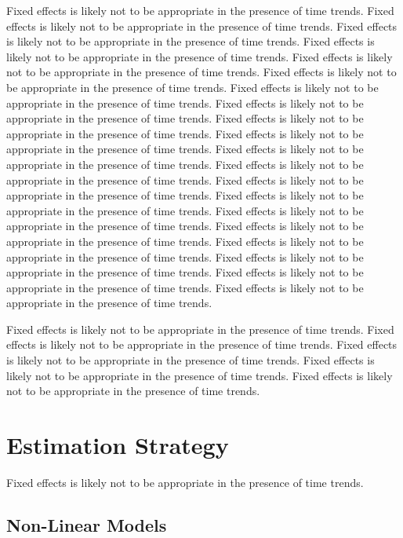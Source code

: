 \documentclass[11pt]{article}
\begin{document}
Fixed effects is likely not to be appropriate in the presence of time trends. 
Fixed effects is likely not to be appropriate in the presence of time trends. 
Fixed effects is likely not to be appropriate in the presence of time trends. 
Fixed effects is likely not to be appropriate in the presence of time trends. 
Fixed effects is likely not to be appropriate in the presence of time trends. 
Fixed effects is likely not to be appropriate in the presence of time trends. 
Fixed effects is likely not to be appropriate in the presence of time trends. 
Fixed effects is likely not to be appropriate in the presence of time trends. 
Fixed effects is likely not to be appropriate in the presence of time trends. 
Fixed effects is likely not to be appropriate in the presence of time trends. 
Fixed effects is likely not to be appropriate in the presence of time trends. 
Fixed effects is likely not to be appropriate in the presence of time trends. 
Fixed effects is likely not to be appropriate in the presence of time trends. 
Fixed effects is likely not to be appropriate in the presence of time trends. 
Fixed effects is likely not to be appropriate in the presence of time trends. 
Fixed effects is likely not to be appropriate in the presence of time trends. 
Fixed effects is likely not to be appropriate in the presence of time trends. 
Fixed effects is likely not to be appropriate in the presence of time trends. 
Fixed effects is likely not to be appropriate in the presence of time trends. 
Fixed effects is likely not to be appropriate in the presence of time trends. 

Fixed effects is likely not to be appropriate in the presence of time trends. 
Fixed effects is likely not to be appropriate in the presence of time trends. 
Fixed effects is likely not to be appropriate in the presence of time trends. 
Fixed effects is likely not to be appropriate in the presence of time trends. 
Fixed effects is likely not to be appropriate in the presence of time trends. 



\section{Estimation Strategy}

Fixed effects is likely not to be appropriate in the presence of time trends. 

\subsection{Non-Linear Models}
\end{document}
